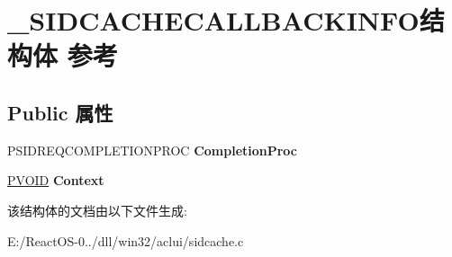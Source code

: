 \hypertarget{struct___s_i_d_c_a_c_h_e_c_a_l_l_b_a_c_k_i_n_f_o}{}\section{\+\_\+\+S\+I\+D\+C\+A\+C\+H\+E\+C\+A\+L\+L\+B\+A\+C\+K\+I\+N\+F\+O结构体 参考}
\label{struct___s_i_d_c_a_c_h_e_c_a_l_l_b_a_c_k_i_n_f_o}
\subsection*{Public 属性}
\begin{DoxyCompactItemize}
\item 
\mbox{\label{struct___s_i_d_c_a_c_h_e_c_a_l_l_b_a_c_k_i_n_f_o_a35fee7c5345185c9e498349ccf92ec4b}} 
P\+S\+I\+D\+R\+E\+Q\+C\+O\+M\+P\+L\+E\+T\+I\+O\+N\+P\+R\+OC {\bfseries Completion\+Proc}
\item 
\mbox{\label{struct___s_i_d_c_a_c_h_e_c_a_l_l_b_a_c_k_i_n_f_o_a085e46b1078cf61f40f50ea177f0c5d8}} 
\hyperlink{interfacevoid}{P\+V\+O\+ID} {\bfseries Context}
\end{DoxyCompactItemize}


该结构体的文档由以下文件生成\+:\begin{DoxyCompactItemize}
\item 
E\+:/\+React\+O\+S-\/0../dll/win32/aclui/sidcache.\+c\end{DoxyCompactItemize}
